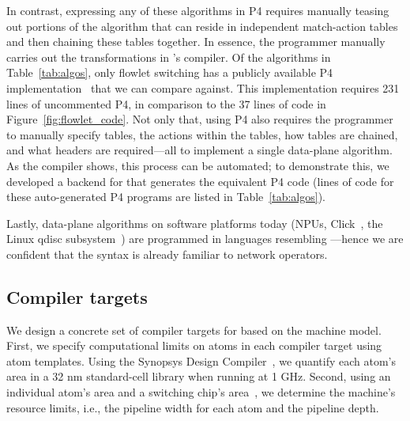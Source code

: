 In contrast, expressing any of these algorithms in P4 requires manually teasing
out portions of the algorithm that can reside in independent match-action
tables and then chaining these tables together. In essence, the programmer
manually carries out the transformations in \pktlanguage's compiler. Of the
algorithms in Table~\ref{tab:algos}, only flowlet switching has a publicly
available P4 implementation~\cite{p4_flowlet} that we can compare against. This
implementation requires 231 lines of uncommented P4, in comparison to the 37
lines of \pktlanguage code in Figure~\ref{fig:flowlet_code}. Not only that,
using P4 also requires the programmer to manually specify tables, the actions
within the tables, how tables are chained, and what headers are required---all
to implement a single data-plane algorithm. As the \pktlanguage compiler shows,
this process can be automated; to demonstrate this, we developed a backend for
\pktlanguage that generates the equivalent P4 code (lines of code for these auto-generated P4
programs are listed in Table~\ref{tab:algos}).

Lastly, data-plane algorithms on software platforms today (NPUs,
Click~\cite{click}, the Linux qdisc subsystem~\cite{qdisc})  are programmed in languages
resembling \pktlanguage---hence we are confident that the \pktlanguage
syntax is already familiar to network operators.


\subsection{Compiler targets}
\label{ss:targets}

We design a concrete set of compiler targets for \pktlanguage based on the
\absmachine machine model. First, we specify computational limits on atoms in
each compiler target using atom templates. Using the Synopsys Design
Compiler~\cite{synopsys_dc}, we quantify each atom's area in a 32 nm
standard-cell library when running at 1 GHz.  Second, using an individual
atom's area and a switching chip's area~\cite{gibb_parsing}, we determine the
machine's resource limits, i.e., the pipeline width for each atom and the
pipeline depth.

